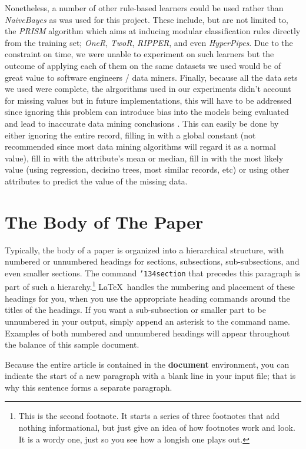 \documentclass{sig-alternate}
\begin{document}
Nonetheless, a number of other rule-based learners could be used rather than {\em NaiveBayes} as was used for this project. These include, but are not limited to, the {\em PRISM} algorithm which aims at inducing modular classification rules directly from the training set; {\em OneR}, {\em TwoR}, {\em RIPPER}, and even {\em HyperPipes}. Due to the constraint on time, we were unable to experiment on such learners but the outcome of applying each of them on the same datasets we used would be of great value to software engineers / data miners. 
Finally, because all the data sets we used were complete, the alrgorithms used in our experiments didn't account for missing values but in future implementations, this will have to be addressed since ignoring this problem can introduce bias into the models being evaluated and lead to inaccurate data mining conclusions \cite{missingdata}. This can easily be done by either ignoring the entire record, filling in with a global constant (not recommended since most data mining algorithms will regard it as a normal value), fill in with the attribute's mean or median, fill in with the most likely value (using regression, decisino trees, most similar records, etc) or using other attributes to predict the value of the missing data.


\section{The {\secit Body} of The Paper}
Typically, the body of a paper is organized
into a hierarchical structure, with numbered or unnumbered
headings for sections, subsections, sub-subsections, and even
smaller sections.  The command \texttt{{\char'134}section} that
precedes this paragraph is part of such a
hierarchy.\footnote{This is the second footnote.  It
starts a series of three footnotes that add nothing
informational, but just give an idea of how footnotes work
and look. It is a wordy one, just so you see
how a longish one plays out.} \LaTeX\ handles the numbering
and placement of these headings for you, when you use
the appropriate heading commands around the titles
of the headings.  If you want a sub-subsection or
smaller part to be unnumbered in your output, simply append an
asterisk to the command name.  Examples of both
numbered and unnumbered headings will appear throughout the
balance of this sample document.

Because the entire article is contained in
the \textbf{document} environment, you can indicate the
start of a new paragraph with a blank line in your
input file; that is why this sentence forms a separate paragraph.
\end{document}
